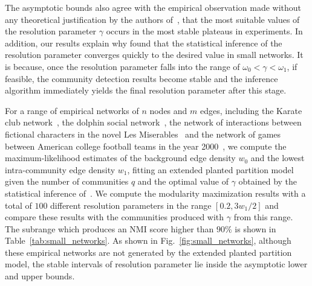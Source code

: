 The asymptotic bounds also agree with the empirical observation made without any theoretical justification by the authors of~\cite{fenn2009dynamic,traag2013significant,mucha2010community}, that the most suitable values of the resolution parameter $\gamma$ occurs in the most stable plateaus in experiments. In addition, our results explain why \cite{newman2016equivalence} found that the statistical inference of the resolution parameter converges quickly to the desired value in small networks. It is because, once the resolution parameter falls into the range of $\omega_0<\gamma<\omega_1$, if feasible, the community detection results become stable and the inference algorithm immediately yields the final resolution parameter after this stage.

For a range of empirical networks of $n$ nodes and $m$ edges, including the Karate club network~\cite{zachary1977information}, the dolphin social network~\cite{lusseau2003bottlenose}, the network of interactions between fictional characters in the novel Les Miserables~\cite{newman2004finding} and the network of games between American college football teams in the year 2000~\cite{newman2004finding}, we compute the maximum-likelihood estimates of the background edge density $w_0$ and the lowest intra-community edge density $w_1$, fitting an extended planted partition model given the number of communities $q$ and the optimal value of $\gamma$ obtained by the statistical inference of~\cite{newman2016equivalence}. We compute the modularity maximization results with a total of $100$ different resolution parameters in the range $[0.2,3w_1/2]$ and compare these results with the communities produced with $\gamma$ from this range. The subrange which produces an NMI score higher than $90\%$ is shown in Table~\ref{tab:small_networks}. As shown in Fig.~\ref{fig:small_networks}, although these empirical networks are not generated by the extended planted partition model, the stable intervals of resolution parameter lie inside the asymptotic lower and upper bounds.

